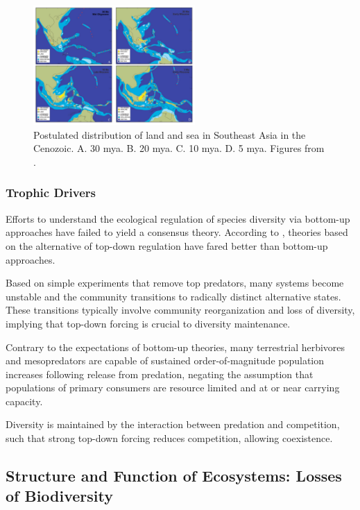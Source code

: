    \begin{figure}[ht]
    \centering
        \includegraphics[width = 0.55\textwidth]{graphics/geology.jpg}
        \caption{Postulated distribution of land and sea in Southeast Asia in the Cenozoic. A. 30 mya. B. 20 mya. C. 10 mya. D. 5 mya. Figures from \cite{hall2002cenozoic}.}
    \end{figure} 
		
\subsubsection{Trophic Drivers}

Efforts to understand the ecological regulation of species diversity via bottom-up approaches have failed to yield a consensus theory. According to \citet{terborgh2015toward}, theories based on the alternative of top-down regulation have fared better than bottom-up approaches. 

Based on simple experiments that remove top predators, many systems become unstable and the community transitions to radically distinct alternative states. These transitions typically involve community reorganization and loss of diversity, implying that top-down forcing is crucial to diversity maintenance.
 
Contrary to the expectations of bottom-up theories, many terrestrial herbivores and mesopredators are capable of sustained order-of-magnitude population increases following release from predation, negating the assumption that populations of primary consumers are resource limited and at or near carrying capacity.
 
Diversity is maintained by the interaction between predation and competition, such that strong top-down forcing reduces competition, allowing coexistence.

\subsection{Structure and Function of Ecosystems: Losses of Biodiversity}


